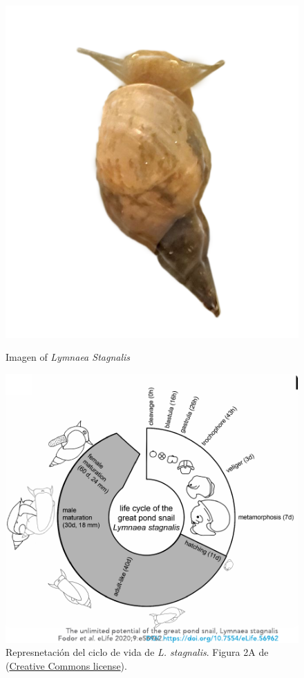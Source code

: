 \begin{figure}[htb!]
	\begin{minipage}{0.35\textwidth}
		\centering
		\includegraphics[width=\linewidth]{img/intro/lymnaea.png} 
		\caption{Imagen of \textit{Lymnaea Stagnalis}}
		\label{fig:snail spanish}
	\end{minipage}
	\hfill
	\begin{minipage}{0.65\textwidth}
		\centering
		\includegraphics[width=\textwidth]{img/intro/lymnaea_life_cycle.pdf}
		\caption{Represnetación del ciclo de vida de \textit{L. stagnalis}. Figura 2A de \textcite{fodor_unlimited_2020} (\href{http://creativecommons.org/licenses/by/4.0/}{Creative Commons license}).}
		\label{fig:lymnaea_life_cycle spanish}
	\end{minipage}
\end{figure}


